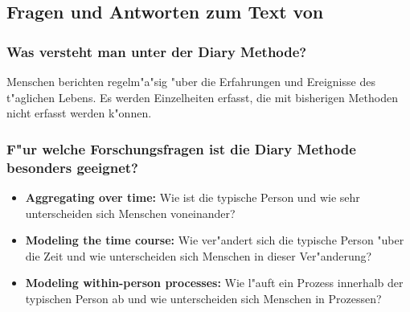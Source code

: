 \subsection{Fragen und Antworten zum Text von \textcite{bolger_diary_2003}}
\subsubsection{Was versteht man unter der Diary Methode?}
Menschen berichten regelm"a"sig "uber die Erfahrungen und Ereignisse des t"aglichen Lebens. Es werden Einzelheiten erfasst, die mit bisherigen Methoden nicht erfasst werden k"onnen. 

\subsubsection{F"ur welche Forschungsfragen ist die Diary Methode besonders geeignet?}
\begin{itemize}
        \item \textbf{Aggregating over time:} Wie ist die typische Person und wie sehr unterscheiden sich Menschen voneinander?
        \item \textbf{Modeling the time course:} Wie ver"andert sich die typische Person "uber die Zeit und wie unterscheiden sich Menschen in dieser Ver"anderung?
        \item \textbf{Modeling within-person processes:} Wie l"auft ein Prozess innerhalb der typischen Person ab und wie unterscheiden sich Menschen in Prozessen?
\end{itemize}

